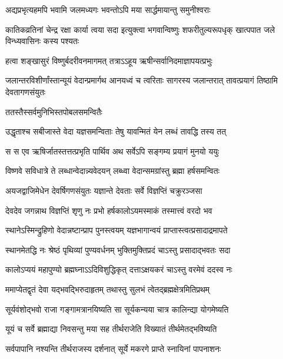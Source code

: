 \twolineshloka
{अद्यप्रभृत्यहमपि भवामि जलमध्यगः}
{भवन्तोऽपि मया सार्द्धमायान्तु समुनीश्वराः} %

\threelineshloka
{कातिकव्रतिनां चेन्द्र रक्षा कार्या त्वया सदा}
{इत्युक्त्वा भगवान्विष्णुः शफरीतुल्यरूपधृक्}
{खात्पपात जले विन्ध्यवासिनः कस्य पश्यतः} %

\twolineshloka
{हत्वा शङ्खासुरं विष्णुर्बदरीवनमागमत्}
{तत्राऽऽहूय ऋषीन्सर्वानिदमाज्ञापयत्प्रभुः} %


\threelineshloka
{जलान्तरविशीर्णांस्तान्यूयं वेदान्प्रमार्गथ}
{आनयध्वं च त्वरिताः सागरस्य जलान्तरात्}
{तावत्प्रयागं तिष्ठामि देवतागणसंयुतः} %



\onelineshloka
{ततस्तैस्सर्वमुनिभिस्तपोबलसमन्वितैः} %

\twolineshloka
{उद्धृताश्च सबीजास्ते वेदा यज्ञसमन्विताः}
{तेषु यावन्मितं येन लब्धं तावद्धि तस्य तत्} %

\twolineshloka
{स स एव ऋषिर्जातस्तत्तत्प्रभृति पार्थिव}
{अथ सर्वेऽपि सङ्गम्य प्रयागं मुनयो ययुः} %

\twolineshloka
{विष्णवे सविधात्रे ते लब्धान्वेदान्न्यवेदयन्}
{लब्ध्वा वेदान्समग्रांस्तु ब्रह्मा हर्षसमन्वितः} %

\twolineshloka
{अयजद्वाजिमेधेन देवर्षिगणसंयुतः}
{यज्ञान्ते देवताः सर्वे विज्ञप्तिं चक्रुरञ्जसा} %


\twolineshloka
{देवदेव जगन्नाथ विज्ञप्तिं शृणु नः प्रभो}
{हर्षकालोऽयमस्माकं तस्मात्त्वं वरदो भव} %

\twolineshloka
{स्थानेऽस्मिन्द्रुहिणो वेदान्नष्टान्प्राप पुनस्त्वयम्}
{यज्ञभागान्वयं प्राप्तास्त्वत्प्रसादाद्रमापते} %

\twolineshloka
{स्थानमेतद्धि नः श्रेष्ठं पृथिव्यां पुण्यवर्धनम्}
{भुक्तिमुक्तिप्रदं चाऽस्तु प्रसादाद्भवतः सदा} %

\twolineshloka
{कालोऽप्ययं महापुण्यो ब्रह्मघ्नाऽऽदिविशुद्धिकृत्}
{दत्ताऽक्षयकरं चाऽस्तु वरमेवं ददस्व नः} %


\twolineshloka
{ममाप्येतद्वृतं देवा यद्भवद्भिरुदाहृतम्}
{तथास्तु सुलभं त्वेतद्ब्रह्मक्षेत्रमितिप्रथम्} %

\twolineshloka
{सूर्यवंशोद्भवो राजा गङ्गामत्रानयिष्यति}
{सा सूर्यकन्यया चात्र कालिन्द्या योगमेष्यति} %

\twolineshloka
{यूयं च सर्वे ब्रह्माद्या निवसन्तु मया सह}
{तीर्थराजेति विख्यातं तीर्थमेतद्भविष्यति} %

\twolineshloka
{सर्वपापानि नश्यन्ति तीर्थराजस्य दर्शनात्}
{सूर्ये मकरगे प्राप्ते स्नायिनां पापनाशनः} %

